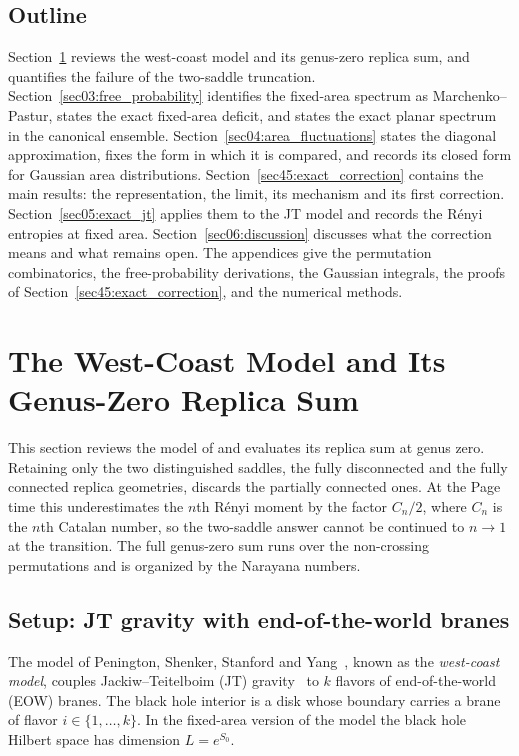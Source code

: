 \documentclass[11pt,letterpaper]{article}
\theoremstyle{plain}
\theoremstyle{definition}
\theoremstyle{remark}
\begin{document}
\subsection{Outline}
\label{subsec01:outline}

Section~\ref{sec02:pssy_model} reviews the west-coast model and its genus-zero replica sum, and quantifies the failure of the two-saddle truncation. Section~\ref{sec03:free_probability} identifies the fixed-area spectrum as Marchenko--Pastur, states the exact fixed-area deficit, and states the exact planar spectrum in the canonical ensemble. Section~\ref{sec04:area_fluctuations} states the diagonal approximation, fixes the form in which it is compared, and records its closed form for Gaussian area distributions. Section~\ref{sec45:exact_correction} contains the main results: the representation, the limit, its mechanism and its first correction. Section~\ref{sec05:exact_jt} applies them to the JT model and records the R\'enyi entropies at fixed area. Section~\ref{sec06:discussion} discusses what the correction means and what remains open. The appendices give the permutation combinatorics, the free-probability derivations, the Gaussian integrals, the proofs of Section~\ref{sec45:exact_correction}, and the numerical methods.

\section{The West-Coast Model and Its Genus-Zero Replica Sum}
\label{sec02:pssy_model}

This section reviews the model of \citet{pssyetal2022} and evaluates its replica sum at genus zero. Retaining only the two distinguished saddles, the fully disconnected and the fully connected replica geometries, discards the partially connected ones. At the Page time this underestimates the $n$th R\'enyi moment by the factor $C_n/2$, where $C_n$ is the $n$th Catalan number, so the two-saddle answer cannot be continued to $n \to 1$ at the transition. The full genus-zero sum runs over the non-crossing permutations and is organized by the Narayana numbers.

\subsection{Setup: JT gravity with end-of-the-world branes}
\label{subsec02:setup}

The model of Penington, Shenker, Stanford and Yang~\citep{pssyetal2022}, known as the \emph{west-coast model}, couples Jackiw--Teitelboim (JT) gravity~\citep{jackiwteitelboim1985,saadetal2019} to $k$ flavors of end-of-the-world (EOW) branes. The black hole interior is a disk whose boundary carries a brane of flavor $i \in \{1, \ldots, k\}$. In the fixed-area version of the model the black hole Hilbert space has dimension $L = e^{S_0}$.
\end{document}
